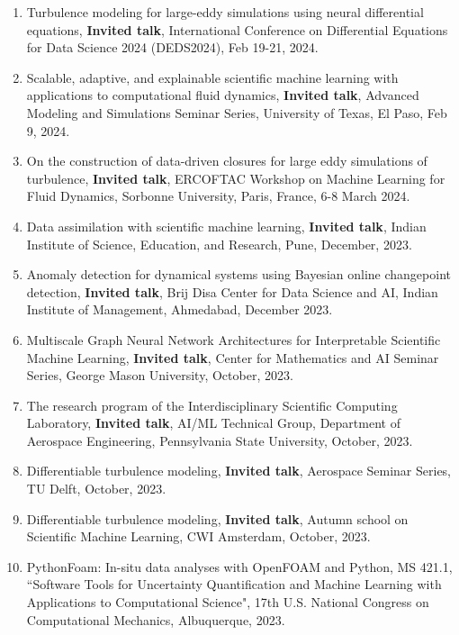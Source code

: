 \documentclass[letterpaper]{article}
\begin{document}
\begin{enumerate}
\item Turbulence modeling for large-eddy simulations using neural differential equations, \textbf{Invited talk}, International Conference on Differential Equations for Data Science 2024 (DEDS2024), Feb 19-21, 2024.

\item Scalable, adaptive, and explainable scientific machine learning with applications to computational fluid dynamics, \textbf{Invited talk}, Advanced Modeling and Simulations Seminar Series, University of Texas, El Paso, Feb 9, 2024.

\item On the construction of data-driven closures for large eddy simulations of turbulence, \textbf{Invited talk}, ERCOFTAC Workshop on Machine Learning for Fluid Dynamics, Sorbonne University, Paris, France, 6-8 March 2024.

\item Data assimilation with scientific machine learning, \textbf{Invited talk}, Indian Institute of Science, Education, and Research, Pune, December, 2023.

\item Anomaly detection for dynamical systems using Bayesian online changepoint detection, \textbf{Invited talk}, Brij Disa Center for Data Science and AI, Indian Institute of Management, Ahmedabad, December 2023.

\item Multiscale Graph Neural Network Architectures for Interpretable Scientific Machine Learning, \textbf{Invited talk}, Center for Mathematics and AI Seminar Series, George Mason University, October, 2023.

\item The research program of the Interdisciplinary Scientific Computing Laboratory, \textbf{Invited talk}, AI/ML Technical Group, Department of Aerospace Engineering, Pennsylvania State University, October, 2023.

\item Differentiable turbulence modeling, \textbf{Invited talk}, Aerospace Seminar Series, TU Delft, October, 2023.

\item Differentiable turbulence modeling, \textbf{Invited talk}, Autumn school on Scientific Machine Learning, CWI Amsterdam, October, 2023.

\item PythonFoam: In-situ data analyses with OpenFOAM and Python, MS 421.1, ``Software Tools for Uncertainty Quantification and Machine Learning with Applications to Computational Science", 17th U.S. National Congress on Computational Mechanics, Albuquerque, 2023.


\end{enumerate}
\end{document}
